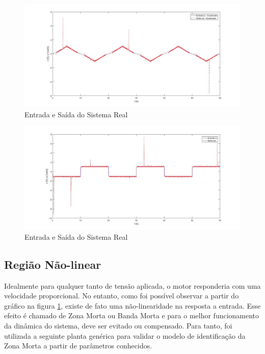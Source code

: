 \documentclass[a4paper,11pt]{article}
\begin{document}
\begin{figure}[H]
    \centering
    \includegraphics[width=1\linewidth]{tex/img/Entrada_e_Saida.jpg}
    \caption{Entrada e Saída do Sistema Real}
    \label{fig:entrada_saida_real}
\end{figure}

\begin{figure}[H]
    \centering
    \includegraphics[width=1\linewidth]{tex/img/Entrada_e_Saida_Linear.jpg}
    \caption{Entrada e Saída do Sistema Real}
    \label{fig:entrada_saida_real_linear}
\end{figure}

\subsection{Região Não-linear}
Idealmente para qualquer tanto de tensão aplicada, o motor responderia com uma velocidade proporcional. No entanto, como foi possível observar a partir do gráfico na figura \ref{fig:entrada_saida_real}, existe de fato uma não-linearidade na resposta a entrada. Esse efeito é chamado de Zona Morta ou Banda Morta e para o melhor funcionamento da dinâmica do sistema, deve ser evitado ou compensado. Para tanto, foi utilizada a seguinte planta genérica para validar o modelo de identificação da Zona Morta a partir de parâmetros conhecidos.
\end{document}
